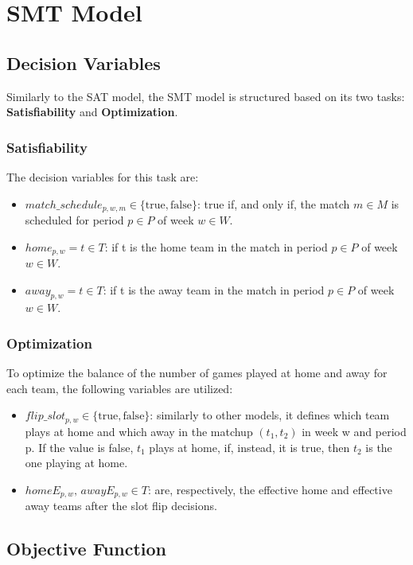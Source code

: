 \section{SMT Model}

\subsection{Decision Variables}

Similarly to the SAT model, the SMT model is structured based on its two tasks: \textbf{Satisfiability} and \textbf{Optimization}.

\subsubsection{Satisfiability}

The decision variables for this task are:
\begin{itemize}
    \item $match\_schedule_{p,w,m} \in \{\text{true}, \text{false}\}$: true if, and only if, the match $m \in M$ is scheduled for period $p \in P$ of week $w \in W$.
    \item $home_{p,w} = t \in T$: if t is the home team in the match in period $p \in P$ of week $w \in W$.
    \item $away_{p,w} = t \in T$: if t is the away team in the match in period $p \in P$ of week $w \in W$.
\end{itemize}

\subsubsection{Optimization}
To optimize the balance of the number of games played at home and away for each team, the following variables are utilized:
\begin{itemize}
    \item $flip\_slot_{p,w} \in \{\text{true}, \text{false}\}$: similarly to other models, it defines which team plays at home and which away in the matchup $(t_1, t_2)$ in week w and period p. If the value is false, $t_1$ plays at home, if, instead, it is true, then $t_2$ is the one playing at home.
    
    \item $homeE_{p,w},\, awayE_{p,w} \in T$: are, respectively, the effective home and effective away teams after the slot flip decisions.
\end{itemize}

\subsection{Objective Function}

